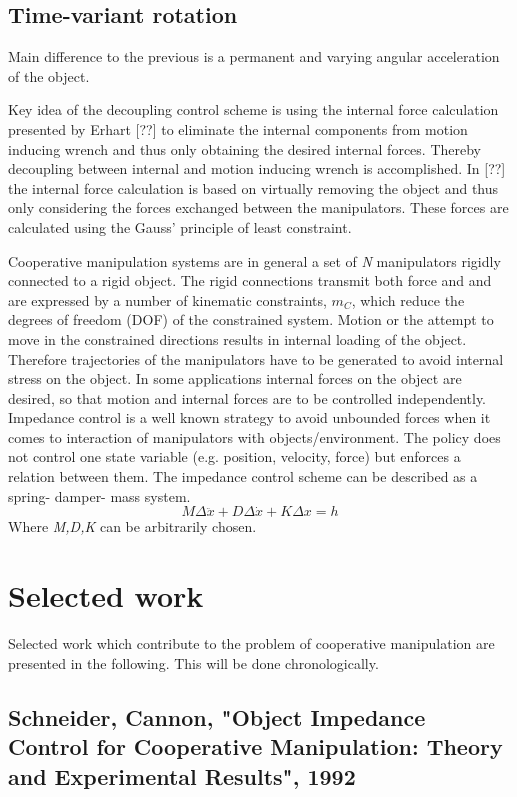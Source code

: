 \documentclass[conference]{IEEEtran}
\begin{document}
\subsection{Time-variant rotation} 
Main difference to the previous is a permanent and varying angular acceleration of the object. 



Key idea of the decoupling control scheme is using the internal force calculation presented by Erhart [??] to eliminate the internal components from motion inducing wrench and thus only obtaining the desired internal forces. Thereby decoupling between internal and motion inducing wrench is accomplished. In [??] the internal force calculation is based on virtually removing the object and thus only considering the forces exchanged between the manipulators. These forces are calculated using the Gauss' principle of least constraint. 

Cooperative manipulation systems are in general a set of \textit{N} manipulators rigidly connected to a rigid object. The rigid connections transmit both force and and are expressed by a number of kinematic constraints, \textit{$ m_{C} $}, which reduce the degrees of freedom (DOF) of the constrained system. Motion or the attempt to move in the constrained directions results in internal loading of the object. Therefore trajectories of the manipulators have to be generated to avoid internal stress on the object. In some applications internal forces on the object are desired, so that motion and internal forces are to be controlled independently.
Impedance control is a well known strategy to avoid unbounded forces when it comes to interaction of manipulators with objects/environment. The policy does not control one state variable (e.g. position, velocity, force) but enforces a relation between them. The impedance control scheme can be described as a spring- damper- mass system.
\begin{equation}
M\Delta\ddot{x} + D\Delta\dot{x} + K\Delta x = h
\end{equation}
Where \textit{M,D,K} can be arbitrarily chosen.


\section{Selected work}
Selected work which contribute to the problem of cooperative manipulation are presented in the following. This will be done chronologically.


\subsection{Schneider, Cannon, "Object Impedance Control for Cooperative Manipulation: Theory and Experimental Results", 1992}
\end{document}

